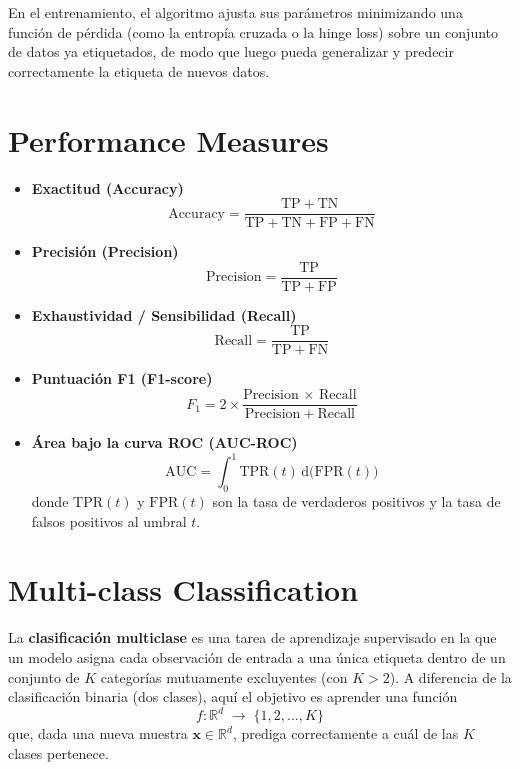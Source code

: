 \documentclass{article}
\begin{document}
En el entrenamiento, el algoritmo ajusta sus parámetros minimizando una función de pérdida (como la entropía cruzada o la hinge loss) sobre un conjunto de datos ya etiquetados, de modo que luego pueda generalizar y predecir correctamente la etiqueta de nuevos datos.

\section{Performance Measures}
\begin{itemize}
  \item \textbf{Exactitud (Accuracy)}
  \[
    \mathrm{Accuracy} =
    \frac{\mathrm{TP} + \mathrm{TN}}
         {\mathrm{TP} + \mathrm{TN} + \mathrm{FP} + \mathrm{FN}}
  \]

  \item \textbf{Precisión (Precision)}
  \[
    \mathrm{Precision} =
    \frac{\mathrm{TP}}{\mathrm{TP} + \mathrm{FP}}
  \]

  \item \textbf{Exhaustividad / Sensibilidad (Recall)}
  \[
    \mathrm{Recall} =
    \frac{\mathrm{TP}}{\mathrm{TP} + \mathrm{FN}}
  \]

  \item \textbf{Puntuación F1 (F1-score)}
  \[
    F_1 =
    2 \times
    \frac{\mathrm{Precision}\,\times\,\mathrm{Recall}}
         {\mathrm{Precision} + \mathrm{Recall}}
  \]

  \item \textbf{Área bajo la curva ROC (AUC-ROC)}
  \[
    \mathrm{AUC} =
    \int_{0}^{1} \mathrm{TPR}(t)\,\mathrm{d}\bigl(\mathrm{FPR}(t)\bigr)
  \]
  donde $\mathrm{TPR}(t)$ y $\mathrm{FPR}(t)$ son la tasa de verdaderos positivos y la tasa de falsos positivos al umbral $t$.
\end{itemize}
\section{Multi-class Classification}

La \textbf{clasificación multiclase} es una tarea de aprendizaje supervisado en la que un modelo asigna cada observación de entrada a una única etiqueta dentro de un conjunto de \(K\) categorías mutuamente excluyentes (con \(K>2\)). A diferencia de la clasificación binaria (dos clases), aquí el objetivo es aprender una función
\[
f: \mathbb{R}^d \;\longrightarrow\;\{1,2,\dots,K\}
\]
que, dada una nueva muestra \(\mathbf{x}\in\mathbb{R}^d\), prediga correctamente a cuál de las \(K\) clases pertenece.
\end{document}
